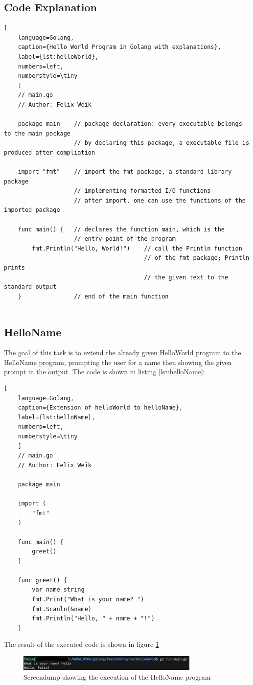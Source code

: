 \subsection*{Code Explanation}
\begin{lstlisting}[
    language=Golang,
    caption={Hello World Program in Golang with explanations},
    label={lst:helloWorld},
    numbers=left,
    numberstyle=\tiny
    ]
    // main.go 
    // Author: Felix Weik

    package main    // package declaration: every executable belongs to the main package
                    // by declaring this package, a executable file is produced after compliation
    
    import "fmt"    // import the fmt package, a standard library package 
                    // implementing formatted I/O functions
                    // after import, one can use the functions of the imported package

    func main() {   // declares the function main, which is the 
                    // entry point of the program
        fmt.Println("Hello, World!")    // call the Println function 
                                        // of the fmt package; Println prints 
                                        // the given text to the standard output
    }               // end of the main function
    
\end{lstlisting}

\subsection*{HelloName}
The goal of this task is to extend the already given HelloWorld program to the HelloName program, prompting the user for a name then showing the given prompt in the output.
The code is shown in listing \ref{lst:helloName}:
\begin{lstlisting}[
    language=Golang,
    caption={Extension of helloWorld to helloName},
    label={lst:helloName},
    numbers=left,
    numberstyle=\tiny
    ]
    // main.go
    // Author: Felix Weik

    package main

    import (
        "fmt"
    )

    func main() {
        greet()
    }

    func greet() {
        var name string
        fmt.Print("What is your name? ")
        fmt.Scanln(&name)
        fmt.Println("Hello, " + name + "!")
    } 
\end{lstlisting}

The result of the executed code is shown in figure \ref{fig:screendump_helloName}

\begin{figure}
    \centering
    \includegraphics[width=0.8\textwidth]{figures/goLang/helloWorld/golang_helloWorld_helloName.png}
    \caption{Screendump showing the execution of the HelloName program}
    \label{fig:screendump_helloName}
\end{figure}
